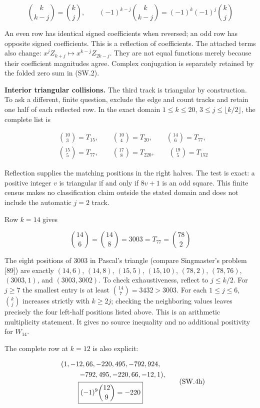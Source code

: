 \documentclass[
  11pt,
]{book}
\begin{document}
\[
\binom{k}{k-j}=\binom{k}{j},\qquad
(-1)^{k-j}\binom{k}{k-j}=(-1)^k(-1)^j\binom{k}{j}
\tag{SW.4c}
\]

An even row has identical signed coefficients when reversed; an odd row
has opposite signed coefficients. This is a reflection of coefficients.
The attached terms also change: \(x^jZ_{k+j}\mapsto x^{k-j}Z_{2k-j}\).
They are not equal functions merely because their coefficient magnitudes
agree. Complex conjugation is separately retained by the folded zero sum
in (SW.2).

\textbf{Interior triangular collisions.} The third track is triangular
by construction. To ask a different, finite question, exclude the edge
and count tracks and retain one half of each reflected row. In the exact
domain \(1\le k\le20\), \(3\le j\le\lfloor k/2\rfloor\), the complete
list is

\[
\begin{aligned}
&\binom{10}{3}=T_{15},\qquad
\binom{10}{4}=T_{20},\qquad
\binom{14}{6}=T_{77},\\
&\binom{15}{5}=T_{77},\qquad
\binom{17}{8}=T_{220},\qquad
\binom{19}{5}=T_{152}
\end{aligned}
\tag{SW.4e}
\]

Reflection supplies the matching positions in the right halves. The test
is exact: a positive integer \(v\) is triangular if and only if \(8v+1\)
is an odd square. This finite census makes no classification claim
outside the stated domain and does not include the automatic \(j=2\)
track.

Row \(k=14\) gives

\[
\boxed{\binom{14}{6}=\binom{14}{8}=3003=T_{77}=\binom{78}{2}}
\tag{SW.4f}
\]

The eight positions of \(3003\) in Pascal's triangle (compare
Singmaster's problem {[}89{]}) are exactly \((14,6)\), \((14,8)\),
\((15,5)\), \((15,10)\), \((78,2)\), \((78,76)\), \((3003,1)\), and
\((3003,3002)\). To check exhaustiveness, reflect to \(j\le k/2\). For
\(j\ge7\) the smallest entry is at least \(\binom{14}{7}=3432>3003\).
For each \(1\le j\le6\), \(\binom{k}{j}\) increases strictly with
\(k\ge2j\); checking the neighboring values leaves precisely the four
left-half positions listed above. This is an arithmetic multiplicity
statement. It gives no source inequality and no additional positivity
for \(W_{14}\).

The complete row at \(k=12\) is also explicit:

\[
\begin{gathered}
(1,-12,66,-220,495,-792,924,\\
\hspace{12mm}-792,495,-220,66,-12,1),\\
\boxed{(-1)^9\binom{12}{9}=-220}
\end{gathered}
\tag{SW.4h}
\]
\end{document}
